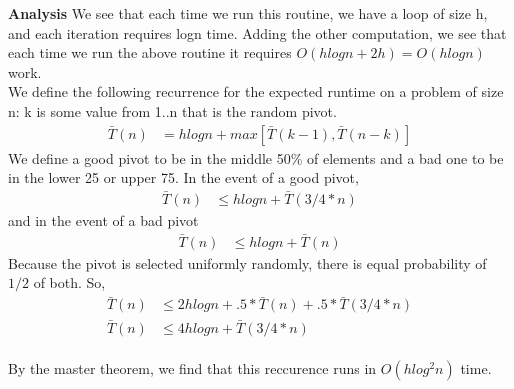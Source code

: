 \documentclass[11pt]{article}
\begin{document}
\begin{solution}
\textbf{Analysis}
We see that each time we run this routine, we have a loop of size h, and each iteration requires logn time. Adding the other computation, we see that each time we run the above routine it requires $O(hlogn + 2h)=O(hlogn)$ work. \\

We define the following recurrence for the expected runtime on a problem of size n: k is some value from 1..n that is the random pivot.
\begin{align*}
\bar{T}(n) &= hlogn + max[\bar{T}(k-1), \bar{T}(n-k)]
\end{align*}
We define a good pivot to be in the middle 50\% of elements and a bad one to be in the lower 25 or upper 75.  In the event of a good pivot, 
\begin{align*}
\bar{T}(n) &\leq hlogn + \bar{T}(3/4 * n)
\end{align*}
and in the event of a bad pivot
\begin{align*}
\bar{T}(n) &\leq hlogn + \bar{T}(n)
\end{align*}
Because the pivot is selected uniformly randomly, there is equal probability of $1/2$ of both. So, 
\begin{align*}
\bar{T}(n) &\leq 2hlogn + .5*\bar{T}(n) + .5*\bar{T}(3/4 * n) \\
\bar{T}(n) &\leq 4hlogn + \bar{T}(3/4 * n)
\end{align*}
\\ By the master theorem, we find that this reccurence runs in $O(hlog^2n)$ time.



\end{solution}
\end{document}
